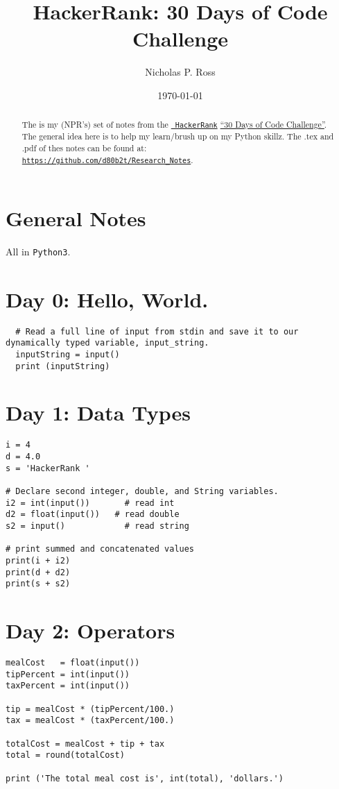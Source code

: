 \documentclass[11pt,a4paper]{article}
\begin{document}
\title{HackerRank: 30 Days of Code Challenge}
\author{Nicholas P. Ross}
\date{\today}
\maketitle




\begin{abstract}
The is my (NPR's) set of notes from the \href{www.hackerrank.com}{\tt
HackerRank}
\href{https://www.hackerrank.com/domains/tutorials/30-days-of-code}{
``30 Days of Code Challenge''}.  The general idea here is to help my
learn/brush up on my Python skillz.  The .tex and .pdf of thes notes
can be found at: \\
 \href{https://github.com/d80b2t/Research\_Notes}{\tt https://github.com/d80b2t/Research\_Notes}.
\end{abstract}


\newpage
\tableofcontents


\newpage
\section*{General Notes}
All in {\tt Python3}. 


\newpage
\section{Day 0: Hello, World.}
\begin{lstlisting}
  # Read a full line of input from stdin and save it to our dynamically typed variable, input_string.
  inputString = input()
  print (inputString)
\end{lstlisting}


\newpage
\section{Day 1: Data Types}
\begin{lstlisting}
i = 4
d = 4.0
s = 'HackerRank '

# Declare second integer, double, and String variables.
i2 = int(input())       # read int
d2 = float(input())   # read double 
s2 = input()            # read string

# print summed and concatenated values
print(i + i2)
print(d + d2)
print(s + s2)
\end{lstlisting}


\newpage
\section{Day 2: Operators}
\begin{lstlisting}
mealCost   = float(input()) 
tipPercent = int(input())   
taxPercent = int(input()) 

tip = mealCost * (tipPercent/100.)
tax = mealCost * (taxPercent/100.)

totalCost = mealCost + tip + tax
total = round(totalCost)

print ('The total meal cost is', int(total), 'dollars.')
\end{lstlisting}
\end{document}
